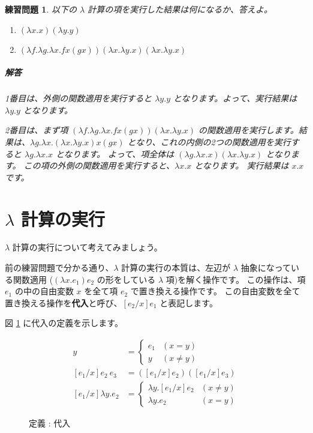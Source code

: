 \documentclass[b5paper]{jsbook}
\newtheorem{exercise}{練習問題}[chapter]
\begin{document}
\begin{exercise}

以下の $\lambda$ 計算の項を実行した結果は何になるか、答えよ。

\begin{enumerate}
  \item $(\lambda x . x) (\lambda y . y)$
  \item $(\lambda f . \lambda g . \lambda x . f x (g x))
		(\lambda x . \lambda y . x) (\lambda x . \lambda y . x)$
\end{enumerate}

\subparagraph{解答}

1番目は、外側の関数適用を実行すると $\lambda y . y$ となります。よって、実行結果は $\lambda y . y$
となります。

2番目は、まず項 $(\lambda f . \lambda g . \lambda x . f x (g x)) (\lambda x . \lambda y . x)$
の関数適用を実行します。結果は、$\lambda g . \lambda x . (\lambda x . \lambda y . x) x (g x)$
となり、これの内側の2つの関数適用を実行すると $\lambda g . \lambda x . x$ となります。
よって、項全体は $(\lambda g . \lambda x . x) (\lambda x . \lambda y . x)$ となります。
この項の外側の関数適用を実行すると、$\lambda x . x$ となります。
実行結果は $x . x$ です。

\end{exercise}

\section{$\lambda$ 計算の実行}

$\lambda$ 計算の実行について考えてみましょう。

前の練習問題で分かる通り、$\lambda$ 計算の実行の本質は、左辺が $\lambda$ 抽象になっている関数適用
($(\lambda x . e_1) e_2$ の形をしている $\lambda$ 項)を解く操作です。
この操作は、項 $e_1$ の中の自由変数 $x$ を全て項 $e_2$ で置き換える操作です。
この自由変数を全て置き換える操作を\textbf{代入}と呼び、$[e_2/x] e_1$ と表記します。

図 \ref{fig:lambda-substitute} に代入の定義を示します。

\begin{figure}[htbp]
  \begin{align*}
    [e_1/x] y & = \left \{
      \begin{array}{ll}
        e_1 & (x = y) \\
        y & (x \neq y)
      \end{array}
      \right. \\
    [e_1/x] e_2 ~ e_3 & = ([e_1/x] e_2) ([e_1/x] e_3) \\
    [e_1/x] \lambda y . e_2 & = \left \{
      \begin{array}{ll}
        \lambda y . [e_1/x] e_2 & (x \neq y) \\
        \lambda y . e_2 & (x = y)
      \end{array}
      \right.
  \end{align*}
  \caption{定義 : 代入}
  \label{fig:lambda-substitute}
\end{figure}
\end{document}
